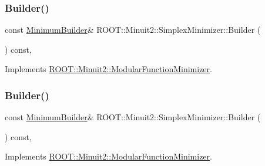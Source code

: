 \mbox{\label{classROOT_1_1Minuit2_1_1SimplexMinimizer_a388494c3f9b45ce6c5d91decef737608}} 
\subsubsection{\texorpdfstring{Builder()}{Builder()}\hspace{0.1cm}{\footnotesize\ttfamily [2/3]}}
{\footnotesize\ttfamily const \mbox{\hyperlink{classROOT_1_1Minuit2_1_1MinimumBuilder}{Minimum\+Builder}}\& R\+O\+O\+T\+::\+Minuit2\+::\+Simplex\+Minimizer\+::\+Builder (\begin{DoxyParamCaption}{ }\end{DoxyParamCaption}) const\hspace{0.3cm}{\ttfamily [inline]}, {\ttfamily [virtual]}}



Implements \mbox{\hyperlink{classROOT_1_1Minuit2_1_1ModularFunctionMinimizer_a13e98551cf14e927c61e1e34ecf8ba8b}{R\+O\+O\+T\+::\+Minuit2\+::\+Modular\+Function\+Minimizer}}.

\mbox{\label{classROOT_1_1Minuit2_1_1SimplexMinimizer_a388494c3f9b45ce6c5d91decef737608}} 
\subsubsection{\texorpdfstring{Builder()}{Builder()}\hspace{0.1cm}{\footnotesize\ttfamily [3/3]}}
{\footnotesize\ttfamily const \mbox{\hyperlink{classROOT_1_1Minuit2_1_1MinimumBuilder}{Minimum\+Builder}}\& R\+O\+O\+T\+::\+Minuit2\+::\+Simplex\+Minimizer\+::\+Builder (\begin{DoxyParamCaption}{ }\end{DoxyParamCaption}) const\hspace{0.3cm}{\ttfamily [inline]}, {\ttfamily [virtual]}}



Implements \mbox{\hyperlink{classROOT_1_1Minuit2_1_1ModularFunctionMinimizer_a13e98551cf14e927c61e1e34ecf8ba8b}{R\+O\+O\+T\+::\+Minuit2\+::\+Modular\+Function\+Minimizer}}.

